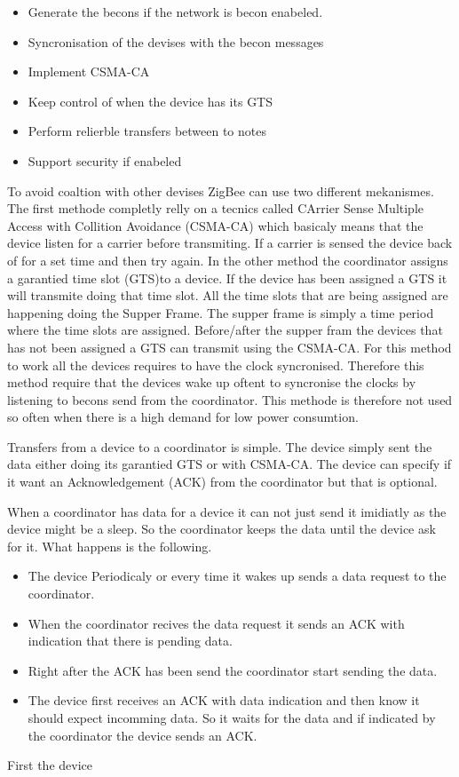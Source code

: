 \documentclass[a4paper,12pt,english]{article}
\begin{document}
\begin{itemize}
  \item Generate the becons if the network is becon enabeled.
  \item Syncronisation of the devises with the becon messages
  \item Implement CSMA-CA
  \item Keep control of when the device has its GTS
  \item Perform relierble transfers between to notes
  \item Support security if enabeled 
\end{itemize}
To avoid coaltion with other devises ZigBee can use two different mekanismes.
The first methode completly relly on a tecnics called CArrier Sense Multiple
Access with Collition Avoidance (CSMA-CA)
which basicaly means that the device listen for a carrier before transmiting. If
a carrier is sensed the device back of for a set time and then try again. In the
other method the coordinator assigns a garantied time slot
(GTS)to a device.
If the device has been assigned a GTS it will transmite doing that time slot.
All the time slots that are being assigned are happening doing the Supper
Frame. The supper frame is simply a time period where the time slots are
assigned. Before/after the supper fram the devices that has not been assigned a
GTS can transmit using the CSMA-CA. For this method to work all the devices
requires to have the clock syncronised. Therefore this method require that the
devices wake up oftent to syncronise the clocks by listening to becons send from
the coordinator. This methode is therefore not used so often when there is a
high demand for low power consumtion.

Transfers from a device to a coordinator is simple. The device simply sent the
data either doing its garantied GTS or with CSMA-CA. The device can specify
if it want an Acknowledgement (ACK) from the
coordinator  but that is optional.

When a coordinator has data for a device it can not just send it
imidiatly as the device might be a sleep. So the coordinator keeps the data
until the device ask for it. What happens is the following.
\begin{itemize}
  \item The device Periodicaly or every time it wakes up sends a data request to
  the coordinator.
  \item When the coordinator recives the data request it sends an ACK with
  indication that there is pending data.
  \item Right after the ACK has been send the coordinator start sending the
  data.
  \item The device first receives an ACK with data indication and then know it
  should expect incomming data. So it waits for the data and if indicated by the
  coordinator the device sends an ACK.
\end{itemize} First the device
\end{document}
